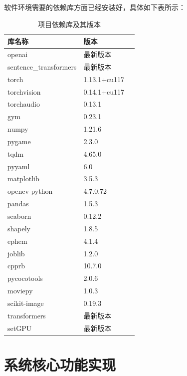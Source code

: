 软件环境需要的依赖库方面已经安装好，具体如下表所示：
\begin{table}[H]
	\centering
	\begin{tabular}{lll}
		\hline
		\small %
		\textbf{库名称} & \textbf{版本} \\
		\hline
		openai & 最新版本 \\
		sentence\_transformers & 最新版本 \\
		torch & 1.13.1+cu117 \\
		torchvision & 0.14.1+cu117 \\
		torchaudio & 0.13.1 \\
		gym & 0.23.1 \\
		numpy & 1.21.6 \\
		pygame & 2.3.0 \\
		tqdm & 4.65.0 \\
		pyyaml & 6.0 \\
		matplotlib & 3.5.3 \\
		opencv-python & 4.7.0.72 \\
		pandas & 1.5.3 \\
		seaborn & 0.12.2 \\
		shapely & 1.8.5 \\
		ephem & 4.1.4 \\
		joblib & 1.2.0 \\
		cpprb & 10.7.0 \\
		pycocotools & 2.0.6 \\
		moviepy & 1.0.3 \\
		scikit-image & 0.19.3 \\
		transformers & 最新版本 \\
		setGPU & 最新版本 \\
		\hline
	\end{tabular}
	\caption{项目依赖库及其版本}
	\label{tab:dependencies}
\end{table}


\section{系统核心功能实现}
